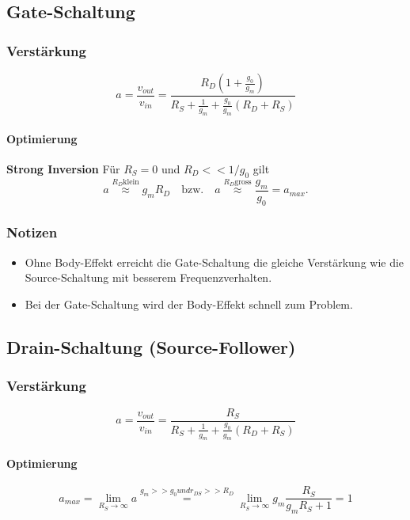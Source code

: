 \subsection{Gate-Schaltung}

\subsubsection{Verstärkung}
\[
    a = \frac{v_{out}}{v_{in}} = \frac{R_D (1+\frac{g_0}{g_m})}{R_S + \frac{1}{g_m} + \frac{g_0}{g_m} (R_D + R_S)}
\]

\paragraph{Optimierung}
\textbf{Strong Inversion}
Für $R_S = 0$ und $R_D << 1/g_0$ gilt
\[
    a \overset{R_D \text{klein}}{\approx} g_m R_D \quad \text{bzw.} \quad a \overset{R_D \text{gross}}{\approx} \frac{g_m}{g_0} = a_{max}.
\]


\subsubsection{Notizen}
\begin{itemize}
    \item Ohne Body-Effekt erreicht die Gate-Schaltung die gleiche Verstärkung wie die Source-Schaltung mit besserem Frequenzverhalten.
    \item Bei der Gate-Schaltung wird der Body-Effekt schnell zum Problem.
\end{itemize}

\subsection{Drain-Schaltung (Source-Follower)}

\subsubsection{Verstärkung}
\[
    a = \frac{v_{out}}{v_{in}} = \frac{R_S}{R_S + \frac{1}{g_m} + \frac{g_0}{g_m} (R_D + R_S)}
\]

\paragraph{Optimierung}
\[
    a_{max} = \lim_{R_S \to \infty} a \overset{g_m >> g_0 und r_{DS} >> R_D}{=} \lim_{R_S \to \infty} g_m \frac{R_S}{g_m R_S + 1} = 1
\]

